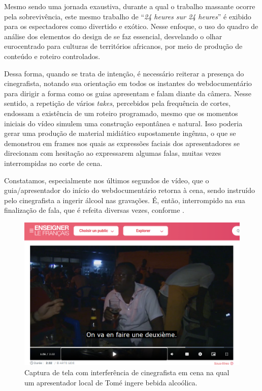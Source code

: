 \documentclass[portuguese]{textolivre}
\begin{document}
Mesmo sendo uma jornada exaustiva, durante a qual o trabalho massante ocorre pela sobrevivência, este mesmo trabalho de “\textit{24 heures sur 24 heures}” é exibido para os espectadores como divertido e exótico. Nesse enfoque, o uso do quadro de análise dos elementos do design de \textcite{kalantzis_letramentos_2020} se faz essencial, desvelando o olhar eurocentrado para culturas de territórios africanos, por meio de produção de conteúdo e roteiro controlados.

Dessa forma, quando se trata de intenção, é necessário reiterar a presença do cinegrafista, notando sua orientação em todos os instantes do webdocumentário para dirigir a forma como os guias apresentam e falam diante da câmera. Nesse sentido, a repetição de vários \textit{takes}, percebidos pela frequência de cortes, endossam a existência de um roteiro programado, mesmo que os momentos iniciais do vídeo simulem uma construção espontânea e natural. Isso poderia gerar uma produção de material midiático supostamente ingênua, o que se demonstrou em frames nos quais as expressões faciais dos apresentadores se direcionam com hesitação ao expressarem algumas falas, muitas vezes interrompidas no corte de cena.

Constatamos, especialmente nos últimos segundos de vídeo, que o guia/apresentador do início do webdocumentário retorna à cena, sendo instruído pelo cinegrafista a ingerir álcool nas gravações. É, então, interrompido na sua finalização de fala, que é refeita diversas vezes, conforme .

\begin{figure}
    \centering
    \begin{minipage}{.75\textwidth}
    \includegraphics[width=\linewidth]{Fig9.png}
    \caption{Captura de tela com interferência de cinegrafista em cena na qual um apresentador local de Tomé ingere bebida alcoólica.}
    \label{fig9}
    \end{minipage}
\end{figure}
\end{document}
